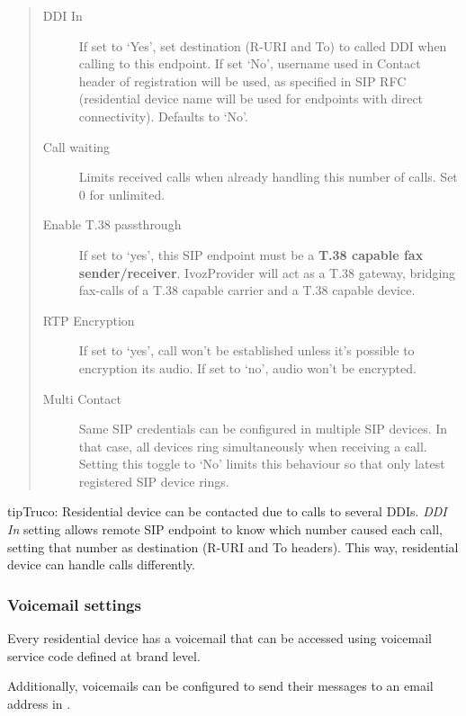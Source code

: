\documentclass[letterpaper,10pt,spanish]{sphinxmanual}
\begin{document}
\begin{quote}
\begin{description}
\item[{DDI In}] \leavevmode
If set to `Yes', set destination (R-URI and To) to called DDI when calling to this endpoint. If set `No', username
used in Contact header of registration will be used, as specified in SIP RFC (residential device name will be used
for endpoints with direct connectivity). Defaults to `No'.

\item[{Call waiting}] \leavevmode
Limits received calls when already handling this number of calls. Set 0 for unlimited.

\item[{Enable T.38 passthrough}] \leavevmode
If set to `yes', this SIP endpoint must be a \textbf{T.38 capable fax sender/receiver}. IvozProvider
will act as a T.38 gateway, bridging fax-calls of a T.38 capable carrier and a T.38 capable device.

\item[{RTP Encryption}] \leavevmode
If set to `yes', call won't be established unless it's possible to encryption its audio. If set to `no',
audio won't be encrypted.

\item[{Multi Contact}] \leavevmode
Same SIP credentials can be configured in multiple SIP devices. In that case, all devices ring
simultaneously when receiving a call. Setting this toggle to `No' limits this behaviour so that
only latest registered SIP device rings.

\end{description}
\end{quote}

\begin{notice}{tip}{Truco:}
Residential device can be contacted due to calls to several DDIs. \emph{DDI In} setting allows remote SIP endpoint to
know which number caused each call, setting that number as destination (R-URI and To headers). This way, residential
device can handle calls differently.
\end{notice}


\subsubsection{Voicemail settings}
\label{administration_portal/client/residential/residential_devices:voicemail-settings}
Every residential device has a voicemail that can be accessed using voicemail service code defined at brand level.

Additionally, voicemails can be configured to send their messages to an email address in {\hyperref[administration_portal/client/residential/residential_voicemails:residential\string-voicemails]{}}.
\end{document}
